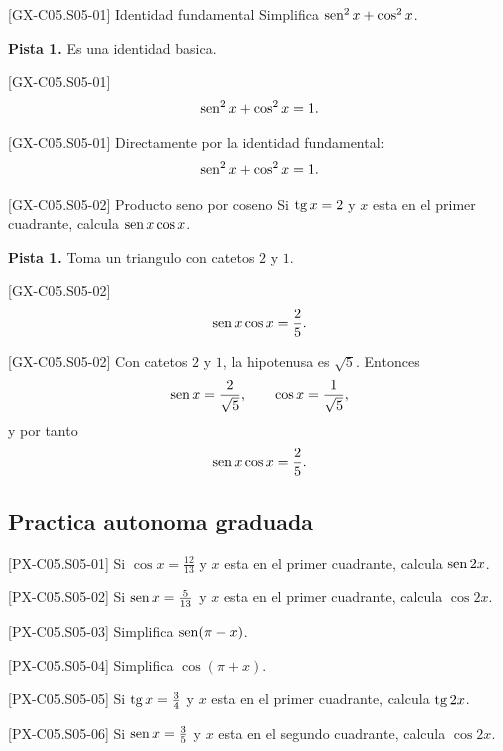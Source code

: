 \begin{guidedexercise}{[GX-C05.S05-01] Identidad fundamental}
Simplifica \(\operatorname{sen}^2 x+\cos^2 x\).

\textbf{Pista 1.} Es una identidad basica.
\end{guidedexercise}

\begin{shortanswer}{[GX-C05.S05-01]}
\[
\operatorname{sen}^2 x+\cos^2 x=1.
\]
\end{shortanswer}

\begin{fullsolution}{[GX-C05.S05-01]}
Directamente por la identidad fundamental:
\[
\operatorname{sen}^2 x+\cos^2 x=1.
\]
\end{fullsolution}

\begin{guidedexercise}{[GX-C05.S05-02] Producto seno por coseno}
Si \(\operatorname{tg} x=2\) y \(x\) esta en el primer cuadrante, calcula \(\operatorname{sen} x\cos x\).

\textbf{Pista 1.} Toma un triangulo con catetos \(2\) y \(1\).
\end{guidedexercise}

\begin{shortanswer}{[GX-C05.S05-02]}
\[
\operatorname{sen} x\cos x=\frac{2}{5}.
\]
\end{shortanswer}

\begin{fullsolution}{[GX-C05.S05-02]}
Con catetos \(2\) y \(1\), la hipotenusa es \(\sqrt{5}\). Entonces
\[
\operatorname{sen} x=\frac{2}{\sqrt{5}},
\qquad
\cos x=\frac{1}{\sqrt{5}},
\]
y por tanto
\[
\operatorname{sen} x\cos x=\frac{2}{5}.
\]
\end{fullsolution}

\subsection*{Practica autonoma graduada}
\begin{exercise}{[PX-C05.S05-01] Si \(\cos x=\frac{12}{13}\) y \(x\) esta en el primer cuadrante, calcula \(\operatorname{sen} 2x\).}
\end{exercise}
\begin{exercise}{[PX-C05.S05-02] Si \(\operatorname{sen} x=\frac{5}{13}\) y \(x\) esta en el primer cuadrante, calcula \(\cos 2x\).}
\end{exercise}
\begin{exercise}{[PX-C05.S05-03] Simplifica \(\operatorname{sen}(\pi-x)\).}
\end{exercise}
\begin{exercise}{[PX-C05.S05-04] Simplifica \(\cos(\pi+x)\).}
\end{exercise}
\begin{exercise}{[PX-C05.S05-05] Si \(\operatorname{tg} x=\frac{3}{4}\) y \(x\) esta en el primer cuadrante, calcula \(\operatorname{tg} 2x\).}
\end{exercise}
\begin{exercise}{[PX-C05.S05-06] Si \(\operatorname{sen} x=\frac{3}{5}\) y \(x\) esta en el segundo cuadrante, calcula \(\cos 2x\).}
\end{exercise}


